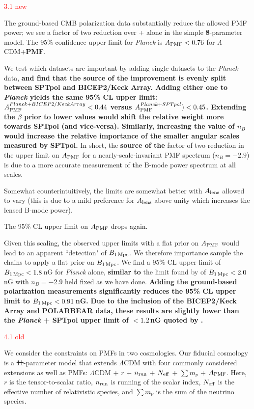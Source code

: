 \documentclass{article}
\newcommand{\apmf}{\ensuremath{A_{\rm PMF}}}
\newcommand{\bpmf}{\ensuremath{B_{\rm 1\,Mpc}}}
\newcommand{\alens}{\ensuremath{A_{\rm lens}}}
\newcommand{\lcdm}{\ensuremath{\Lambda}CDM}
\newcommand{\nrun}{\ensuremath{n_{\rm run}}}
\newcommand{\neff}{\ensuremath{N_{\rm eff}}}
\newcommand{\mnu}{\ensuremath{\sum m_\nu}}
\newcommand{\planck}{{\sl Planck}}
\newcommand{\bicepkeck}{BICEP2/Keck Array}
\newcommand{\sptpol}{SPTpol}
\newcommand{\changed}[1]{\textcolor{Red}{#1}}
\newcommand{\removed}[1]{\st{#1}}
\newcommand{\added}[1]{\textbf{#1}}
\begin{document}
\changed{3.1 new} 

The ground-based CMB polarization data  substantially reduce the allowed PMF power; we see a factor of two reduction over \plan+{} alone in the simple \added{8}-parameter model. 
The 95\% confidence upper limit for \planck{} is $\apmf <  \upperAplk$ for \lcdm{}+\added{PMF}. 

We test which datasets are important by adding single datasets to the \planck{} data, \added{and find that the source of the improvement is evenly split between \sptpol{} and \bicepkeck{}.
Adding either one to \planck{} yields the same 95\% CL upper limit: $\apmf^{\planck+\bicepkeck} <  \upperAbicep$ versus  $\apmf^{\planck+\sptpol}) < \upperAsptpol$. 
Extending the $\beta$ prior to lower values would shift the relative weight more towards \sptpol{} (and vice-versa). 
Similarly, increasing the value of $n_B$ would  increase the relative importance of the smaller angular scales measured by \sptpol.}
In short, the \added{source of the} factor of two reduction in the upper limit on \apmf{} for a nearly-scale-invariant PMF spectrum ($n_B=-2.9$) is due to a more accurate measurement of the B-mode power spectrum at all scales.

Somewhat counterintuitively, the limits are somewhat better with \alens{} allowed to vary (this is due to a mild preference for \alens{} above unity which increases the lensed B-mode power). 

The 95\% CL upper limit on \apmf{} drops again.

Given this scaling, the observed upper limits with a flat prior on \apmf{} would lead to an apparent ``detection" of \bpmf. 
We therefore importance sample the chains to apply a flat prior on \bpmf. 
We find a 95\% CL upper limit of $\bpmf < \upperBplk$\,nG for \planck{} alone,
\added{similar to} the limit found by \citet{planck15-19} of $\bpmf < 2.0$\,nG with $n_B=-2.9$ held fixed as we have done. 
\added{Adding the ground-based polarization measurements significantly reduces the 95\% CL upper limit to $\bpmf < \upperBall$\,nG. }
\added{Due to the inclusion of the \bicepkeck{} and POLARBEAR data, these results are slightly lower than the \planck{} + \sptpol{} upper limit of $<1.2\,$nG quoted by \citet{zucca16}.}

\changed{4.1 old}

We consider the constraints on PMFs in two cosmologies. 
Our fiducial cosmology is a \removed{11}-parameter model that extends \lcdm{} with  four  commonly considered extensions as well as PMFs:  \lcdm{} +  $r$ + \nrun{} +  \neff{} + \mnu{} + \apmf. 
Here, $r$ is the tensor-to-scalar ratio, \nrun{} is running of the scalar index, \neff{} is the effective number of relativistic species, and \mnu{} is the sum of the neutrino species. 
\end{document}
